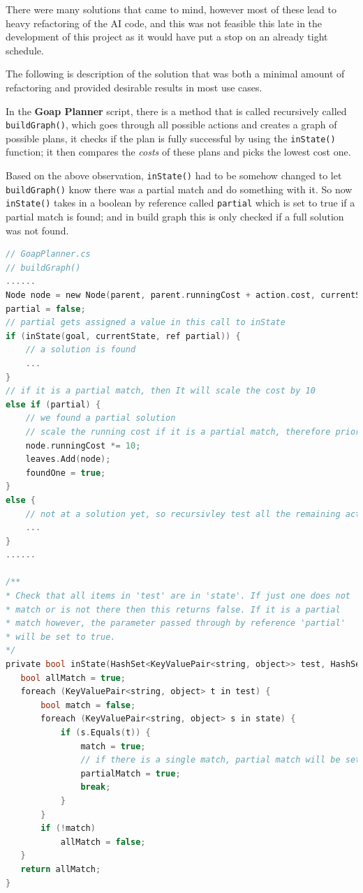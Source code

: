 \documentclass[11pt]{report}
\begin{document}
There were many solutions that came to mind, however most of these lead to heavy refactoring of the AI code, and this was not feasible this late in the development of this project as it would have put a stop on an already tight schedule.

The following is description of the solution that was both a minimal amount of refactoring and provided desirable results in most use cases.

In the \textbf{Goap Planner} script, there is a method that is called recursively called \lstinline{buildGraph()}, which goes through all possible actions and creates a graph of possible plans, it checks if the plan is fully successful by using the \lstinline{inState()} function; it then compares the \textit{costs} of these plans and picks the lowest cost one.

Based on the above observation, \lstinline{inState()}  had to be somehow changed to let \lstinline{buildGraph()} know there was a partial match and do something with it. So now \lstinline{inState()} takes in a boolean by reference called \lstinline{partial} which is set to true if a partial match is found; and in build graph this is only checked if a full solution was not found.

\begin{lstlisting}[language=c]
// GoapPlanner.cs
// buildGraph()
......
Node node = new Node(parent, parent.runningCost + action.cost, currentState, action);
partial = false;
// partial gets assigned a value in this call to inState
if (inState(goal, currentState, ref partial)) {
    // a solution is found   
    ...
}
// if it is a partial match, then It will scale the cost by 10
else if (partial) {
    // we found a partial solution
    // scale the running cost if it is a partial match, therefore prioritising full matches
    node.runningCost *= 10; 
    leaves.Add(node);
    foundOne = true;
}
else {
    // not at a solution yet, so recursivley test all the remaining actions and branch out the tree
    ...
}
......

/**
* Check that all items in 'test' are in 'state'. If just one does not
* match or is not there then this returns false. If it is a partial
* match however, the parameter passed through by reference 'partial'
* will be set to true.
*/
private bool inState(HashSet<KeyValuePair<string, object>> test, HashSet<KeyValuePair<string, object>> state, ref bool partialMatch) {
   bool allMatch = true;
   foreach (KeyValuePair<string, object> t in test) {
       bool match = false;
       foreach (KeyValuePair<string, object> s in state) {
           if (s.Equals(t)) {
               match = true;
               // if there is a single match, partial match will be set to true
               partialMatch = true;
               break;
           }
       }
       if (!match)
           allMatch = false;
   }
   return allMatch;
}
\end{lstlisting}
\end{document}

